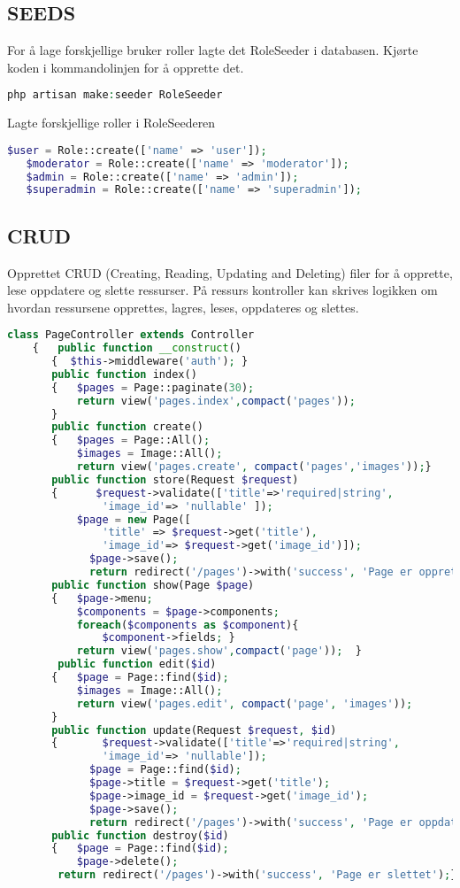 \subsection{SEEDS}
For å lage forskjellige bruker roller lagte det RoleSeeder i databasen.
Kjørte koden i kommandolinjen for å opprette det.
\begin{lstlisting}[language=PHP]
    php artisan make:seeder RoleSeeder
\end{lstlisting}
Lagte forskjellige roller i RoleSeederen
\begin{lstlisting}[language=PHP]
    $user = Role::create(['name' => 'user']);
   $moderator = Role::create(['name' => 'moderator']);
   $admin = Role::create(['name' => 'admin']);
   $superadmin = Role::create(['name' => 'superadmin']);
\end{lstlisting}
\subsection{CRUD}       
Opprettet CRUD (Creating, Reading, Updating and Deleting) filer for å opprette, lese oppdatere og slette ressurser. På ressurs kontroller kan skrives logikken om hvordan ressursene opprettes, lagres, leses, oppdateres og slettes. 

\begin{lstlisting}[language=PHP]
    class PageController extends Controller
    {   public function __construct()
       {  $this->middleware('auth'); }
       public function index()
       {   $pages = Page::paginate(30);
           return view('pages.index',compact('pages'));
       }
       public function create()
       {   $pages = Page::All();
           $images = Image::All();
           return view('pages.create', compact('pages','images'));}
       public function store(Request $request)
       {      $request->validate(['title'=>'required|string',
               'image_id'=> 'nullable' ]);
           $page = new Page([
               'title' => $request->get('title'),
               'image_id'=> $request->get('image_id')]);
             $page->save();
             return redirect('/pages')->with('success', 'Page er opprettet'); }
       public function show(Page $page)
       {   $page->menu;
           $components = $page->components;
           foreach($components as $component){
               $component->fields; }
           return view('pages.show',compact('page'));  }
        public function edit($id)
       {   $page = Page::find($id);
           $images = Image::All();
           return view('pages.edit', compact('page', 'images'));
       }
       public function update(Request $request, $id)
       {	   $request->validate(['title'=>'required|string',
               'image_id'=> 'nullable']);
             $page = Page::find($id);
             $page->title = $request->get('title');
             $page->image_id = $request->get('image_id');
             $page->save();
             return redirect('/pages')->with('success', 'Page er oppdatert'); }
       public function destroy($id)
       {   $page = Page::find($id);
           $page->delete();
        return redirect('/pages')->with('success', 'Page er slettet');}}
\end{lstlisting}

